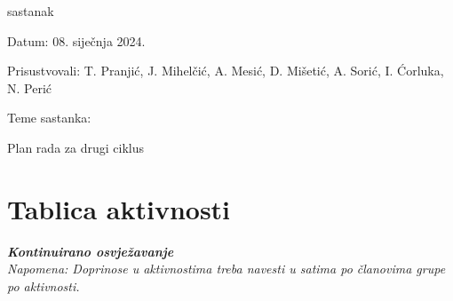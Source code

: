 \begin{packed_enum}
	  \item  sastanak
			\item[] \begin{packed_item}
			  \item Datum: 08. siječnja 2024.
				\item Prisustvovali:  T. Pranjić, J. Mihelčić, A. Mesić, D. Mišetić, A. Sorić, I. Ćorluka, N. Perić
				\item Teme sastanka:
				\begin{packed_item}
					\item  Plan rada za drugi ciklus
        \end{packed_item}
      \end{packed_item}
			
			
		\end{packed_enum}
		
		\eject
		\section*{Tablica aktivnosti}
		
			\textbf{\textit{Kontinuirano osvježavanje}}\\
			
			 \textit{Napomena: Doprinose u aktivnostima treba navesti u satima po članovima grupe po aktivnosti.}

